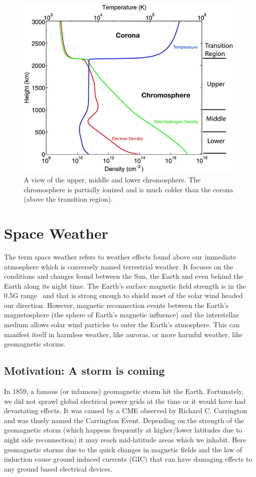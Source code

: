 \documentclass[12pt,upcase]{umlthesis}
\begin{document}
\begin{figure}[ht!]\label{fig:chromoprofile}
	\centering
	\includegraphics[width=0.75\linewidth]{images/chromoprofile.jpg}
	\caption{A view of the upper, middle and lower chromosphere. The chromosphere is partially ionized and is much colder than the corona (above the transition region).~\citep{Song2014,Avrett2008}}
\end{figure}


\section{Space Weather}

The term space weather refers to weather effects found above our immediate atmosphere which is conversely named terrestrial weather. It focuses on the conditions and changes found between the Sun, the Earth and even behind the Earth along its night time. The Earth's surface magnetic field strength is in the 0.5G range~\citep{Finlay2010} and that is strong enough to shield most of the solar wind headed our direction. However, magnetic reconnection events between the Earth's magnetosphere (the sphere of Earth's magnetic influence) and the interstellar medium allows solar wind particles to enter the Earth's atmosphere. This can manifest itself in harmless weather, like auroras, or more harmful weather, like geomagnetic storms.

\subsection{Motivation: A storm is coming}

In 1859, a famous (or infamous) geomagnetic storm hit the Earth. Fortunately, we did not sprawl global electrical power grids at the time or it would have had devastating effects. It was caused by a CME observed by Richard C. Carrington and was thusly named the Carrington Event. Depending on the strength of the geomagnetic storm (which happens frequently at higher/lower latitudes due to night side reconnection) it may reach mid-latitude areas which we inhabit. Here geomagnetic storms due to the quick changes in magnetic fields and the law of induction cause ground induced currents (GIC) that can have damaging effects to any ground based electrical devices.
\end{document}
